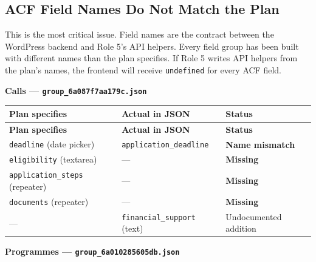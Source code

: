 \documentclass[12pt,a4paper]{article}
\begin{document}
\subsection{ACF Field Names Do Not Match the Plan}

\begin{darkbox}
This is the most critical issue. Field names are the contract between the WordPress backend
and Role 5's API helpers. Every field group has been built with different names than the
plan specifies. If Role 5 writes API helpers from the plan's names, the frontend will
receive \texttt{undefined} for every ACF field.
\end{darkbox}

\vspace{0.8em}
\noindent\textbf{Calls --- \texttt{group\_6a087f7aa179c.json}}

\vspace{0.4em}
\begin{longtable}{@{}p{4cm}p{4.2cm}p{4.1cm}@{}}
\toprule
\rowcolor{uvtLightBlue}
\textbf{Plan specifies} & \textbf{Actual in JSON} & \textbf{Status} \\
\midrule
\endfirsthead
\toprule
\rowcolor{uvtLightBlue}
\textbf{Plan specifies} & \textbf{Actual in JSON} & \textbf{Status} \\
\midrule
\endhead
\bottomrule
\endfoot
\texttt{deadline} (date picker) & \texttt{application\_deadline} & \textcolor{statusRed}{\textbf{Name mismatch}} \\
\texttt{eligibility} (textarea) & --- & \textcolor{statusRed}{\textbf{Missing}} \\
\texttt{application\_steps} (repeater) & --- & \textcolor{statusRed}{\textbf{Missing}} \\
\texttt{documents} (repeater) & --- & \textcolor{statusRed}{\textbf{Missing}} \\
--- & \texttt{financial\_support} (text) & \textcolor{statusOrange}{Undocumented addition} \\
\end{longtable}

\vspace{0.8em}
\noindent\textbf{Programmes --- \texttt{group\_6a010285605db.json}}
\end{document}
